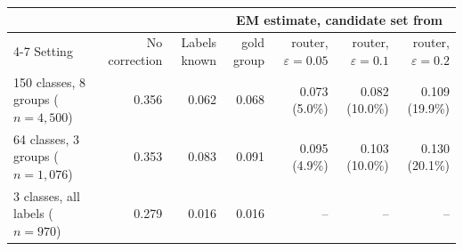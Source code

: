 \begin{tabular}{lrrrrrr}
\toprule
 & & & \multicolumn{4}{c}{EM estimate, candidate set from} \\
\cmidrule(lr){4-7}
Setting & No correction & Labels known & gold group & router, $\varepsilon=0.05$ & router, $\varepsilon=0.1$ & router, $\varepsilon=0.2$ \\
\midrule
150 classes{,} 8 groups ($n=4{,}500$) & 0.356 & 0.062 & 0.068 & 0.073 (5.0\%) & 0.082 (10.0\%) & 0.109 (19.9\%) \\
64 classes{,} 3 groups ($n=1{,}076$) & 0.353 & 0.083 & 0.091 & 0.095 (4.9\%) & 0.103 (10.0\%) & 0.130 (20.1\%) \\
3 classes{,} all labels ($n=970$) & 0.279 & 0.016 & 0.016 & -- & -- & -- \\
\bottomrule
\end{tabular}
